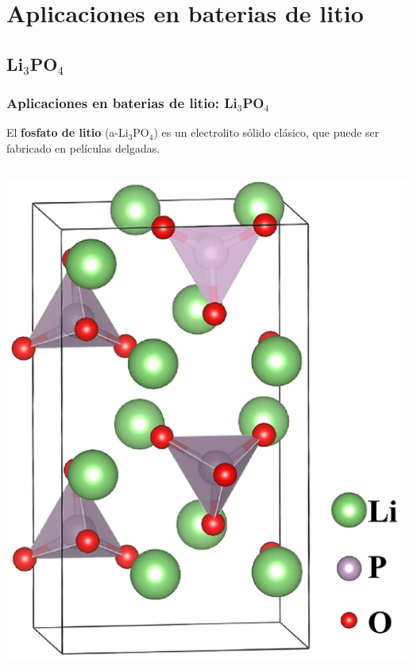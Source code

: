 \documentclass[aspectratio=169]{beamer}
\let\oldtextbf\textbf
\renewcommand{\textbf}[1]{\textcolor{nordblue}{\oldtextbf{#1}}}
\begin{document}
    \section{Aplicaciones en baterias de litio}

    \subsection{Li$_3$PO$_4$}

    \begin{frame}
        \frametitle{Aplicaciones en baterias de litio: Li$_3$PO$_4$}
            
        El \textbf{fosfato de litio} (a-Li$_3$PO$_4$) es un electrolito sólido 
        clásico, que puede ser fabricado en películas delgadas.
            
        \begin{columns}
            \begin{center}
                \includegraphics[width=\columnwidth]{Li3PO4-estructura.png}
            \end{center}
        

\end{columns}
\end{frame}
\end{document}
